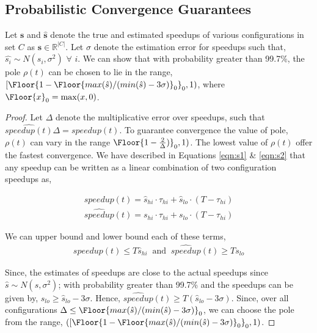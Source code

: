 \subsection*{Probabilistic Convergence Guarantees}


\begin{theorem}
  Let $\mathbf{s}$ and $\hat{\mathbf{s}}$ denote the true and estimated speedups of various configurations in set $C$ as $\mathbf{s} \in \mathbb{R}^{|C|}$. Let $\sigma$ denote the
  estimation error for speedups such that, $\hat{s_i} \sim
  N(s_i, \sigma^2)$ $\forall$ $i$. We can show that with probability
  greater than 99.7\%, the pole $\rho(t)$ can be chosen to lie in the range, $[\Floor{1- \Floor{max(\hat{s})/(min(\hat{s}) -  3\sigma)}_0}_0, 1)$, where $\Floor{x}_0 = \max(x,0)$.
\end{theorem}

\begin{proof}
Let $\Delta$ denote the multiplicative error over speedups, such that $ \widehat{speedup(t)}\Delta = speedup(t) $. To
guarantee convergence the value of pole, $\rho(t)$ can vary in the range
$\Floor{1-\frac{2}{\Delta})}_0, 1)$\cite{ICSE2014}. The lowest value of $\rho(t)$ offer the fastest convergence. We have described in Equations \ref{eqn:s1} \& \ref{eqn:s2} that any speedup can be written as a linear combination of two configuration speedups as,

\begin{align}
speedup(t) = \hat{s}_{hi} \cdot \tau_{hi} + \hat{s}_{lo} \cdot (T - \tau_{hi})
\end{align}
\begin{align}
\widehat{speedup}(t) = s_{hi} \cdot \tau_{hi} + s_{lo} \cdot (T - \tau_{hi})
\end{align}

We can upper bound and lower bound each of these terms,
\begin{align}
speedup(t) \leq T \hat{s}_{hi} \;\; \text{and} \;\; \widehat{speedup}(t) \geq T s_{lo}
\end{align}

Since, the estimates of speedups are close to the actual speedups since
$\hat{s} \sim N(s, \sigma^2)$; with probability greater
than 99.7\% and the speedups can be given by, $s_{lo} \geq
\hat{s}_{lo} - 3 \sigma$. Hence, $\widehat{speedup}(t) \geq T
(\hat{s}_{lo} -3 \sigma)$. Since, over all configurations $\Delta \leq
\Floor{max(\hat{s})/(min(\hat{s}) - 3\sigma)}_0$,  we can choose the pole from the range,  $([\Floor{1- \Floor{max(\hat{s})/(min(\hat{s}) - 3\sigma)}_0}_0, 1)$.


\end{proof}
